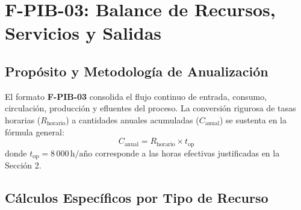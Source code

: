 \documentclass[10pt,letterpaper]{article}
\begin{document}
\section{F-PIB-03: Balance de Recursos, Servicios y Salidas}

\subsection{Propósito y Metodología de Anualización}
El formato \textbf{F-PIB-03} consolida el flujo continuo de entrada, consumo, circulación, producción y efluentes del proceso. La conversión rigurosa de tasas horarias ($R_{\text{horario}}$) a cantidades anuales acumuladas ($C_{\text{anual}}$) se sustenta en la fórmula general:
\begin{equation}
C_{\text{anual}} = R_{\text{horario}} \times t_{\text{op}}
\end{equation}
donde $t_{\text{op}} = 8\,000\,\text{h/año}$ corresponde a las horas efectivas justificadas en la Sección 2.

\subsection{Cálculos Específicos por Tipo de Recurso}
\end{document}
